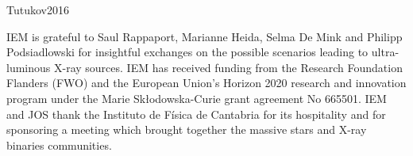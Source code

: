\documentclass[letter]{aa}
\makeatletter
\newcommand{\sgx}{SgXB\xspace}
\newcommand{\ulx}{ULX\xspace}
\newcommand*{\rlof}{RLOF\@\xspace}
\newcommand*{\ns}{NS\@\xspace}
\newcommand*{\ie}{i.e.\@\xspace}
\makeatother
\begin{document}




Tutukov2016

\begin{acknowledgements}
IEM is grateful to Saul Rappaport, Marianne Heida, Selma De Mink and Philipp Podsiadlowski for insightful exchanges on the possible scenarios leading to ultra-luminous X-ray sources. IEM has received funding from the Research Foundation Flanders (FWO) and the European Union's Horizon 2020 research and innovation program under the Marie Sk\l odowska-Curie grant agreement No 665501. IEM and JOS thank the Instituto de F\'{i}sica de Cantabria for its hospitality and for sponsoring a meeting which brought together the massive stars and X-ray binaries communities.
\end{acknowledgements}


\begin{tiny}

\end{tiny}
\end{document}
